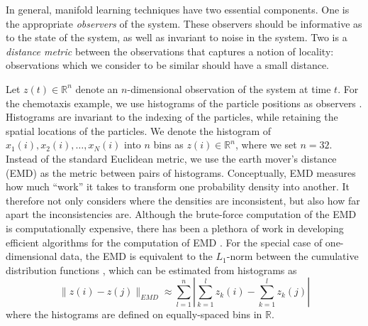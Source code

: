 \documentclass[prl, reprint, final, showkeys]{revtex4-1}
\begin{document}
In general, manifold learning techniques have two essential components.
%
One is the appropriate {\em observers} of the system. 
%
These observers should be informative as to the state of the system, as well as invariant to noise in the system. 
%
Two is a {\em distance metric} between the observations that captures a notion of locality: observations which we consider to be similar should have a small distance. 

Let $z(t) \in \mathbb{R}^n$ denote an $n$-dimensional observation of the system at time $t$. 
%
For the chemotaxis example, we use histograms of the particle positions as observers \cite{talmon2013empirical}. 
%
Histograms are invariant to the indexing of the particles, while retaining the spatial locations of the particles.
%
We denote the histogram of $x_1(i), x_2(i), \dots, x_N(i)$ into $n$ bins as $z(i) \in \mathbb{R}^n$, where we set $n=32$.
%
Instead of the standard Euclidean metric, we use the earth mover's distance (EMD) \cite{rubner2000earth} as the metric between pairs of histograms. 
%
Conceptually, EMD measures how much ``work'' it takes to transform one probability density into another.
%
It therefore not only considers where the densities are inconsistent, but also how far apart the inconsistencies are.
%
Although the brute-force computation of the EMD is computationally expensive, there has been a plethora of work in developing efficient algorithms for the computation of EMD \cite{Pele-eccv2008, Pele-iccv2009}.
%
%
For the special case of one-dimensional data, the EMD is equivalent to the $L_1$-norm between the cumulative distribution functions \cite{rubner2000perceptual}, which can be estimated from histograms as
\begin{equation}
\| z(i) - z(j) \|_{EMD} \approx \sum_{l=1}^{n} \left| \sum_{k=1}^l z_k(i) - \sum_{k=1}^l z_k(j) \right|
\end{equation}
where the histograms are defined on equally-spaced bins in $\mathbb{R}$. 
\end{document}
